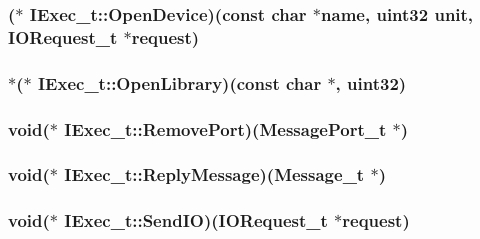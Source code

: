 \hypertarget{structIExec__t_a8a22f0677d3cb7add6a91fd9f535a68a}{
\subsubsection[{Open\+Device}]{($\ast$ I\+Exec\+\_\+t\+::\+Open\+Device)(const char $\ast$name, {\bf uint32} unit, {\bf I\+O\+Request\+\_\+t} $\ast$request)}}\label{structIExec__t_a8a22f0677d3cb7add6a91fd9f535a68a}
\hypertarget{structIExec__t_a5aaad46798a981d39ea50184bedb88d2}{
\subsubsection[{Open\+Library}]{$\ast$($\ast$ I\+Exec\+\_\+t\+::\+Open\+Library)(const char $\ast$, {\bf uint32})}}\label{structIExec__t_a5aaad46798a981d39ea50184bedb88d2}
\hypertarget{structIExec__t_a345b67e7a05a9e498716b6ea41586b61}{
\subsubsection[{Remove\+Port}]{\setlength{\rightskip}{0pt plus 5cm}void($\ast$ I\+Exec\+\_\+t\+::\+Remove\+Port)({\bf Message\+Port\+\_\+t} $\ast$)}}\label{structIExec__t_a345b67e7a05a9e498716b6ea41586b61}
\hypertarget{structIExec__t_a2caebccfdf0bf902e5dc29a11907366f}{
\subsubsection[{Reply\+Message}]{\setlength{\rightskip}{0pt plus 5cm}void($\ast$ I\+Exec\+\_\+t\+::\+Reply\+Message)({\bf Message\+\_\+t} $\ast$)}}\label{structIExec__t_a2caebccfdf0bf902e5dc29a11907366f}
\hypertarget{structIExec__t_aa702c2f17347a64369b3d308cfa52491}{
\subsubsection[{Send\+I\+O}]{\setlength{\rightskip}{0pt plus 5cm}void($\ast$ I\+Exec\+\_\+t\+::\+Send\+I\+O)({\bf I\+O\+Request\+\_\+t} $\ast$request)}}\label{structIExec__t_aa702c2f17347a64369b3d308cfa52491}
